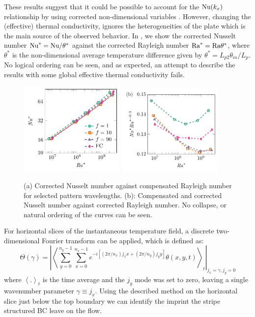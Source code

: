 These results suggest that it could be possible to account for the $\text{Nu}(k_x)$
relationship by using corrected non-dimensional variables 
\citep{Verzicco2004}. However, changing the (effective) thermal conductivity, ignores
the heterogeneities of the plate which is the main source of the observed
behavior. In , we show the corrected Nusselt number
$\text{Nu}^*=\text{Nu}/\theta^*$ against the corrected Rayleigh number $\text{Ra}^*=\text{Ra}
\theta^*$, where $\theta^*$ is the non-dimensional average temperature
difference given by $\theta^*=L_{p2}\theta_{in}/L_p$. No logical ordering can
be seen, and as expected, an attempt to describe the results with some global
effective thermal conductivity fails.


\begin{figure}
\centering
\includegraphics[width=0.46\textwidth]{fig6a.pdf}
\includegraphics[width=0.46\textwidth]{fig6b.pdf}
\caption{%
(a) Corrected Nusselt number against compensated Rayleigh number
for selected pattern wavelengths. (b): Compensated and corrected
Nusselt number against corrected Rayleigh number.
No collapse, or natural ordering of the 
curves can be seen.  }
\label{figure5}
\end{figure}


%
For horizontal slices of the instantaneous temperature field, a discrete
two-dimensional Fourier transform can be applied, which is defined as:
%
\begin{equation} \Theta(\gamma) = \left| \left< \sum\limits_{y=0}^{n_y-1}
\sum\limits_{x=0}^{n_x-1} e^{-i\left[ (2\pi / n_x)j_x x + (2\pi/n_y)j_y
y\right]} \theta(x,y,t) \right>_{t} \right|_{j_x=\gamma,j_y=0} \end{equation}
%
where $\left< . \right>_t$ is the time average and the $j_y$ mode was set to
zero, leaving a single wavenumber parameter $\gamma \equiv j_x$.
Using the described method on the horizontal slice just below the top boundary
we can identify the imprint the stripe structured BC leave on the flow.

